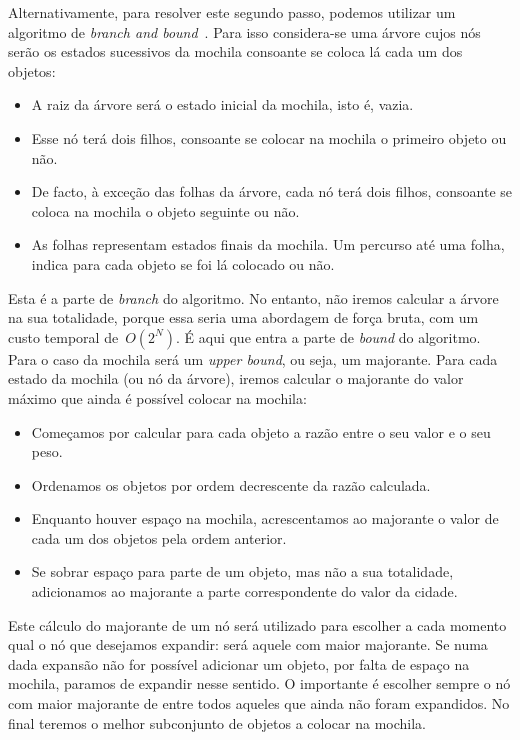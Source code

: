 \documentclass[12pt,a4paper,reqno]{report}
\numberwithin{equation}{section}
\begin{document}
Alternativamente, para resolver este segundo passo, podemos utilizar um algoritmo de \emph{branch and bound}~\cite{tube_bnb_kp_1, tube_bnb_kp_2, Narahari:2000}. Para isso considera-se uma árvore cujos nós serão os estados sucessivos da mochila consoante se coloca lá cada um dos objetos:
\begin{itemize} 
	\item A raiz da árvore será o estado inicial da mochila, isto é, vazia.
	\item Esse nó terá dois filhos, consoante se colocar na mochila o primeiro objeto ou não.
	\item De facto, à exceção das folhas da árvore, cada nó terá dois filhos, consoante se coloca na mochila o objeto seguinte ou não.
	\item As folhas representam estados finais da mochila. Um percurso até uma folha, indica para cada objeto se foi lá colocado ou não.
\end{itemize}
Esta é a parte de \emph{branch} do algoritmo. No entanto, não iremos calcular a árvore na sua totalidade, porque essa seria uma abordagem de força bruta, com um custo temporal de~$O(2^N)$. É aqui que entra a parte de \emph{bound} do algoritmo. Para o caso da mochila será um \emph{upper bound}, ou seja, um majorante. Para cada estado da mochila (ou nó da árvore), iremos calcular o majorante do valor máximo que ainda é possível colocar na mochila:
\begin{itemize}
	\item Começamos por calcular para cada objeto a razão entre o seu valor e o seu peso.
	\item Ordenamos os objetos por ordem decrescente da razão calculada.
	\item Enquanto houver espaço na mochila, acrescentamos ao majorante o valor de cada um dos objetos pela ordem anterior.
	\item Se sobrar espaço para parte de um objeto, mas não a sua totalidade, adicionamos ao majorante a parte correspondente do valor da cidade.
\end{itemize}
Este cálculo do majorante de um nó será utilizado para escolher a cada momento qual o nó que desejamos expandir: será aquele com maior majorante. Se numa dada expansão não for possível adicionar um objeto, por falta de espaço na mochila, paramos de expandir nesse sentido. O importante é escolher sempre o nó com maior majorante de entre todos aqueles que ainda não foram expandidos. No final teremos o melhor subconjunto de objetos a colocar na mochila.
\end{document}
